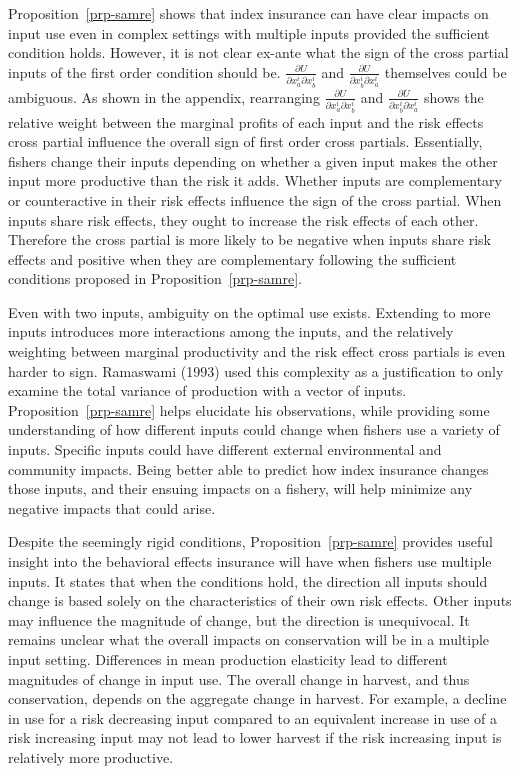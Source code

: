 \documentclass[
  letterpaper,
  DIV=11,
  numbers=noendperiod]{scrartcl}
\theoremstyle{plain}
\theoremstyle{plain}
\theoremstyle{remark}
\begin{document}
Proposition~\ref{prp-samre} shows that index insurance can have clear
impacts on input use even in complex settings with multiple inputs
provided the sufficient condition holds. However, it is not clear
ex-ante what the sign of the cross partial inputs of the first order
condition should be. \(\frac{\partial U}{\partial x^i_a\partial x^i_b}\)
and \(\frac{\partial U}{\partial x^i_b\partial x^i_a}\) themselves could
be ambiguous. As shown in the appendix, rearranging
\(\frac{\partial U}{\partial x^i_a\partial x^i_b}\) and
\(\frac{\partial U}{\partial x^i_b\partial x^i_a}\) shows the relative
weight between the marginal profits of each input and the risk effects
cross partial influence the overall sign of first order cross partials.
Essentially, fishers change their inputs depending on whether a given
input makes the other input more productive than the risk it adds.
Whether inputs are complementary or counteractive in their risk effects
influence the sign of the cross partial. When inputs share risk effects,
they ought to increase the risk effects of each other. Therefore the
cross partial is more likely to be negative when inputs share risk
effects and positive when they are complementary following the
sufficient conditions proposed in Proposition~\ref{prp-samre}.

Even with two inputs, ambiguity on the optimal use exists. Extending to
more inputs introduces more interactions among the inputs, and the
relatively weighting between marginal productivity and the risk effect
cross partials is even harder to sign. Ramaswami (1993) used this
complexity as a justification to only examine the total variance of
production with a vector of inputs. Proposition~\ref{prp-samre} helps
elucidate his observations, while providing some understanding of how
different inputs could change when fishers use a variety of inputs.
Specific inputs could have different external environmental and
community impacts. Being better able to predict how index insurance
changes those inputs, and their ensuing impacts on a fishery, will help
minimize any negative impacts that could arise.

Despite the seemingly rigid conditions, Proposition~\ref{prp-samre}
provides useful insight into the behavioral effects insurance will have
when fishers use multiple inputs. It states that when the conditions
hold, the direction all inputs should change is based solely on the
characteristics of their own risk effects. Other inputs may influence
the magnitude of change, but the direction is unequivocal. It remains
unclear what the overall impacts on conservation will be in a multiple
input setting. Differences in mean production elasticity lead to
different magnitudes of change in input use. The overall change in
harvest, and thus conservation, depends on the aggregate change in
harvest. For example, a decline in use for a risk decreasing input
compared to an equivalent increase in use of a risk increasing input may
not lead to lower harvest if the risk increasing input is relatively
more productive.
\end{document}

